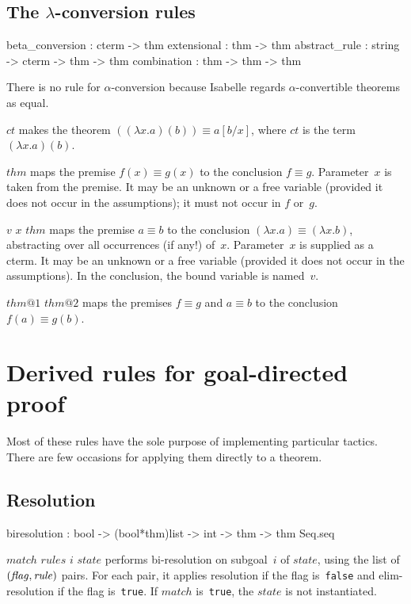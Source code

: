 \subsection{The $\lambda$-conversion rules}
\begin{ttbox} 
beta_conversion : cterm -> thm
extensional     : thm -> thm
abstract_rule   : string -> cterm -> thm -> thm
combination     : thm -> thm -> thm
\end{ttbox} 
There is no rule for $\alpha$-conversion because Isabelle regards
$\alpha$-convertible theorems as equal.
\begin{ttdescription}
\item[\ttindexbold{beta_conversion} $ct$] 
makes the theorem $((\lambda x.a)(b)) \equiv a[b/x]$, where $ct$ is the
term $(\lambda x.a)(b)$.

\item[\ttindexbold{extensional} $thm$] 
maps the premise $f(x) \equiv g(x)$ to the conclusion $f\equiv g$.
Parameter~$x$ is taken from the premise.  It may be an unknown or a free
variable (provided it does not occur in the assumptions); it must not occur
in $f$ or~$g$.

\item[\ttindexbold{abstract_rule} $v$ $x$ $thm$] 
maps the premise $a\equiv b$ to the conclusion $(\lambda x.a) \equiv
(\lambda x.b)$, abstracting over all occurrences (if any!) of~$x$.
Parameter~$x$ is supplied as a cterm.  It may be an unknown or a free
variable (provided it does not occur in the assumptions).  In the
conclusion, the bound variable is named~$v$.

\item[\ttindexbold{combination} $thm@1$ $thm@2$] 
maps the premises $f\equiv g$ and $a\equiv b$ to the conclusion~$f(a)\equiv
g(b)$.
\end{ttdescription}


\section{Derived rules for goal-directed proof}
Most of these rules have the sole purpose of implementing particular
tactics.  There are few occasions for applying them directly to a theorem.

\subsection{Resolution}
\begin{ttbox} 
biresolution : bool -> (bool*thm)list -> int -> thm
               -> thm Seq.seq
\end{ttbox}
\begin{ttdescription}
\item[\ttindexbold{biresolution} $match$ $rules$ $i$ $state$] 
performs bi-resolution on subgoal~$i$ of $state$, using the list of $\it
(flag,rule)$ pairs.  For each pair, it applies resolution if the flag
is~{\tt false} and elim-resolution if the flag is~{\tt true}.  If $match$
is~{\tt true}, the $state$ is not instantiated.
\end{ttdescription}


